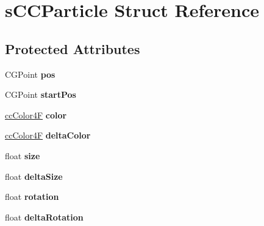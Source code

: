 \hypertarget{structs_c_c_particle}{\section{s\-C\-C\-Particle Struct Reference}
\label{structs_c_c_particle}
}
\subsection*{Protected Attributes}
\begin{DoxyCompactItemize}
\item 
\hypertarget{structs_c_c_particle_a984b3b33db7610651b30cdac2ad68518}{C\-G\-Point {\bfseries pos}}\label{structs_c_c_particle_a984b3b33db7610651b30cdac2ad68518}

\item 
\hypertarget{structs_c_c_particle_a08596790a1211f940ba70f60ccfe25fe}{C\-G\-Point {\bfseries start\-Pos}}\label{structs_c_c_particle_a08596790a1211f940ba70f60ccfe25fe}

\item 
\hypertarget{structs_c_c_particle_af3920fa588cad85cc4122b56b239c690}{\hyperlink{cc_types_8h_aecc18290defe020343f1d7bb2ee73145}{cc\-Color4\-F} {\bfseries color}}\label{structs_c_c_particle_af3920fa588cad85cc4122b56b239c690}

\item 
\hypertarget{structs_c_c_particle_a457951de655ba6d5cff10d57d7699bae}{\hyperlink{cc_types_8h_aecc18290defe020343f1d7bb2ee73145}{cc\-Color4\-F} {\bfseries delta\-Color}}\label{structs_c_c_particle_a457951de655ba6d5cff10d57d7699bae}

\item 
\hypertarget{structs_c_c_particle_a8cdaa0e4035df1099f2b0acf6471b9f8}{float {\bfseries size}}\label{structs_c_c_particle_a8cdaa0e4035df1099f2b0acf6471b9f8}

\item 
\hypertarget{structs_c_c_particle_af9d716b363ebee79d3fce8f49ee7e572}{float {\bfseries delta\-Size}}\label{structs_c_c_particle_af9d716b363ebee79d3fce8f49ee7e572}

\item 
\hypertarget{structs_c_c_particle_a41775052a6f3820e2e71015de7a0ab46}{float {\bfseries rotation}}\label{structs_c_c_particle_a41775052a6f3820e2e71015de7a0ab46}

\item 
\hypertarget{structs_c_c_particle_af5a7c0163c644d95d57a1229e56c293f}{float {\bfseries delta\-Rotation}}\label{structs_c_c_particle_af5a7c0163c644d95d57a1229e56c293f}


\end{DoxyCompactItemize}
